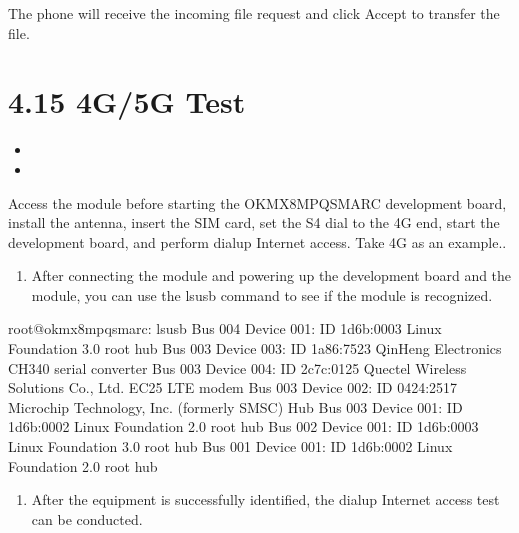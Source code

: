 \documentclass[letterpaper,10pt,openany,english]{sphinxmanual}
\begin{document}
\sphinxAtStartPar
The phone will receive the incoming file request and click Accept to transfer the file.


\section{4.15 4G/5G Test}
\label{\detokenize{linux-manual:id4}}
\sphinxAtStartPar
{}
\begin{itemize}
\item {} 
\sphinxAtStartPar
{}

\item {} 
\sphinxAtStartPar
{}

\end{itemize}

\sphinxAtStartPar
Access the module before starting the OK\sphinxhyphen{}MX8MPQ\sphinxhyphen{}SMARC development board, install the antenna, insert the SIM card, set the S4 dial to the 4G end, start the development board, and perform dial\sphinxhyphen{}up Internet access. Take 4G as an example..
\begin{enumerate}
%
\item {} 
\sphinxAtStartPar
After connecting the module and powering up the development board and the module, you can use the lsusb command to see if the module is recognized.

\end{enumerate}

\begin{sphinxVerbatim}[commandchars=\\\{\}]
root@ok\PYGZhy{}mx8mpq\PYGZhy{}smarc:\PYGZti{}\PYGZsh{} lsusb
Bus 004 Device 001: ID 1d6b:0003 Linux Foundation 3.0 root hub
Bus 003 Device 003: ID 1a86:7523 QinHeng Electronics CH340 serial converter
Bus 003 Device 004: ID 2c7c:0125 Quectel Wireless Solutions Co., Ltd. EC25 LTE modem
Bus 003 Device 002: ID 0424:2517 Microchip Technology, Inc. (formerly SMSC) Hub
Bus 003 Device 001: ID 1d6b:0002 Linux Foundation 2.0 root hub
Bus 002 Device 001: ID 1d6b:0003 Linux Foundation 3.0 root hub
Bus 001 Device 001: ID 1d6b:0002 Linux Foundation 2.0 root hub
\end{sphinxVerbatim}
\begin{enumerate}
%
\setcounter{enumi}{1}
\item {} 
\sphinxAtStartPar
After the equipment is successfully identified, the dial\sphinxhyphen{}up Internet access test can be conducted.

\end{enumerate}
\end{document}

